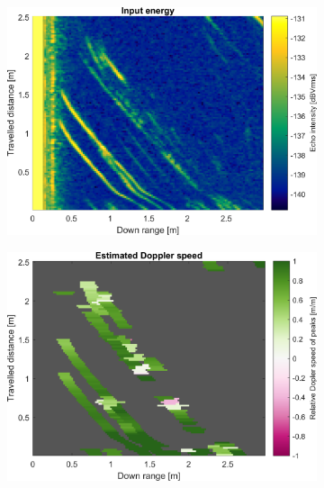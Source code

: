 \begin{figure}[htbp]
    \centering
    \begin{subfigure}[t]{0.475\linewidth}
        \centering
        \includegraphics[width=\linewidth,max height=.475\textheight]{gfx/results/nirvana_input.png}
    \end{subfigure}%
    \hfill%
    \begin{subfigure}[t]{0.475\linewidth}
        \centering
        \includegraphics[width=\linewidth,max height=.475\textheight]{gfx/results/nirvana_doppler.png}
    \end{subfigure}\bigskip\\
    \begin{subfigure}[t]{0.475\linewidth}  
        \centering 

\end{subfigure}
\end{figure}
